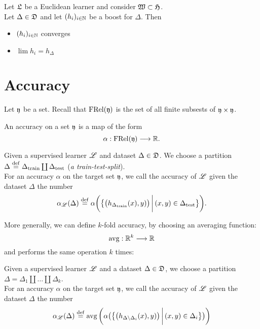 \begin{theorem}
Let $\mathfrak{L}$ be a Euclidean learner and consider $\mathfrak{W}\subset \mathfrak{H}$.\\ Let $\Delta \in \mathfrak{D}$ and let $(h_i)_{i \in \mathbb{N}}$ be a boost for $\Delta$. Then 
\begin{itemize}
\item $(h_i)_{i \in \mathbb{N}}$ converges
\item $\lim h_i = h_\Delta$
\end{itemize}
\end{theorem}






\section{Accuracy}
Let $\mathfrak{y}$ be a set. Recall that $\operatorname{FRel}(\mathfrak{y})$ is the set of all finite subsests of $\mathfrak{y}\times \mathfrak{y}$.
\begin{definition}
An accuracy on a set $\mathfrak{y}$ is a map of the form
\[
\alpha: \operatorname{FRel}(\mathfrak{y})\longrightarrow \mathbb{R}.
\]
\end{definition}
\begin{definition}
Given a supervised learner $\r{L}$ and dataset $\Delta \in \mathfrak{D}$. We choose a partition $\Delta \stackrel{\operatorname{def}}{=} \Delta_{\operatorname{train}}\coprod \Delta_{\operatorname{test}}$ (\emph{a train-test-split}).\\
For an accuracy $\alpha$ on the target set $\mathfrak{y}$, we call the accuracy of $\r{L}$ given the dataset $\Delta$ the number
\[
\alpha_\r{L}(\Delta)\define \alpha  \bigg(  \big\{ \big( h_{\Delta_{\train}}  (x),y)  \big) \,\bigg\vert \,(x,y)\in \Delta_{\test} \big\}\bigg).
\]
\end{definition}

\noindent More generally, we can define $k$-fold accuracy, by choosing an averaging function:
\[
\operatorname{avg}: \mathbb{R}^k\longrightarrow \mathbb{R}
\]
and performs the same operation $k$ times:
\begin{definition}
Given a supervised learner $\r{L}$ and a dataset $\Delta \in \mathfrak{D}$, we choose a partition $\Delta = \Delta_1 \coprod \ldots \coprod \Delta_k$.\\
For an accuracy $\alpha$ on the target set $\mathfrak{y}$, we call the accuracy of $\r{L}$ given the dataset $\Delta$ the number
\[
\alpha_\r{L}(\Delta)\define \avg\bigg(\alpha\big(\big\{ \big( h_{\Delta\setminus \Delta_i}(x),y)  \big) \,\bigg\vert \,(x,y)\in \Delta_i \big\}\big)\bigg)
\]
\end{definition}


